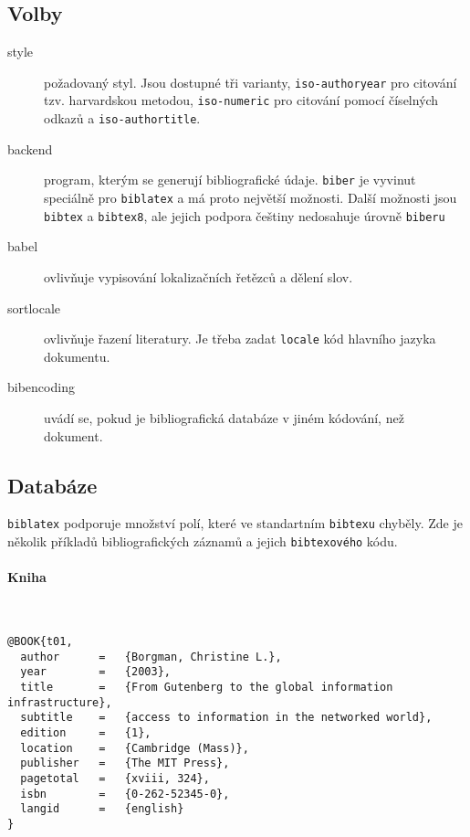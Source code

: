 \documentclass[a4paper,10pt]{ltxdockit}
\def\t|#1|{\texttt{#1}}
\def\c#1{%
\hangpara{3em}{1}%
\fullcite{#1}}
\begin{document}
\subsection{Volby}
\begin{description}
\item[style] požadovaný styl. Jsou dostupné tři varianty, \t|iso-authoryear| pro citování tzv. harvardskou metodou, \t|iso-numeric| pro citování pomocí číselných odkazů a \t|iso-authortitle|.
\item[backend] program, kterým se generují bibliografické údaje. \t|biber| je vyvinut speciálně pro \t|biblatex| a má proto největší možnosti. Další možnosti jsou \t|bibtex| a \t|bibtex8|, ale jejich podpora češtiny nedosahuje úrovně \t|biberu|
\item[babel] ovlivňuje vypisování lokalizačních řetězců a dělení slov.
\item[sortlocale] ovlivňuje řazení literatury. Je třeba zadat \t|locale| kód hlavního jazyka dokumentu.
\item[bibencoding] uvádí se, pokud je bibliografická databáze v jiném kódování, než dokument. 

\end{description}


\subsection{Databáze}

\t|biblatex| podporuje množství polí, které ve standartním \t|bibtexu| chyběly. Zde je několik příkladů bibliografických záznamů a jejich \t|bibtexového| kódu.


\paragraph{Kniha} \hfill\\

\c{t01}
\begin{verbatim}
@BOOK{t01,
  author      =   {Borgman, Christine L.}, 
  year        =   {2003},
  title       =   {From Gutenberg to the global information infrastructure}, 
  subtitle    =   {access to information in the networked world},
  edition     =   {1},
  location    =   {Cambridge (Mass)}, 
  publisher   =   {The MIT Press},
  pagetotal   =   {xviii, 324},
  isbn        =   {0-262-52345-0},
  langid      =   {english}
}
\end{verbatim} 
\end{document}
